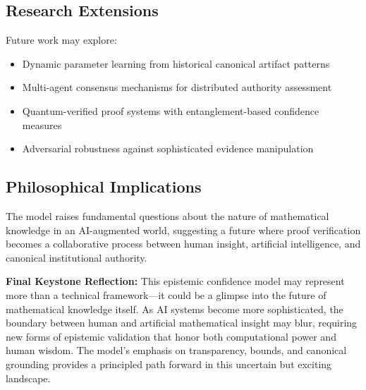 \documentclass[12pt,a4paper]{article}
\theoremstyle{definition}
\theoremstyle{remark}
\begin{document}
\subsection{Research Extensions}

Future work may explore:
\begin{itemize}
    \item Dynamic parameter learning from historical canonical artifact patterns
    \item Multi-agent consensus mechanisms for distributed authority assessment
    \item Quantum-verified proof systems with entanglement-based confidence measures
    \item Adversarial robustness against sophisticated evidence manipulation
\end{itemize}

\subsection{Philosophical Implications}

The model raises fundamental questions about the nature of mathematical knowledge in an AI-augmented world, suggesting a future where proof verification becomes a collaborative process between human insight, artificial intelligence, and canonical institutional authority.

\begin{reflectionbox}
\textbf{Final Keystone Reflection:} This epistemic confidence model may represent more than a technical framework—it could be a glimpse into the future of mathematical knowledge itself. As AI systems become more sophisticated, the boundary between human and artificial mathematical insight may blur, requiring new forms of epistemic validation that honor both computational power and human wisdom. The model's emphasis on transparency, bounds, and canonical grounding provides a principled path forward in this uncertain but exciting landscape.
\end{reflectionbox}



\end{document}
